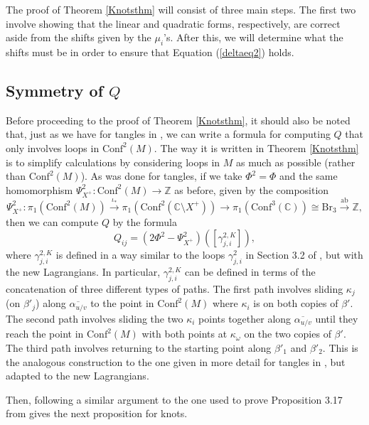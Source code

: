 \documentclass[11pt]{amsart}
\theoremstyle{plain}
\theoremstyle{definition}
\theoremstyle{remark}
\begin{document}
The proof of Theorem \ref{Knotsthm} will consist of three main steps. The first two involve showing that the linear and quadratic forms, respectively, are correct aside from the shifts given by the $\mu_i$'s. After this, we will determine what the shifts must be in order to ensure that Equation (\ref{deltaeq2}) holds.  

\subsection{Symmetry of $Q$}

Before proceeding to the proof of Theorem \ref{Knotsthm}, it should also be noted that, just as we have for tangles in \cite{JHpI26}, we can write a formula for computing $Q$ that only involves loops in $\text{Conf}^2(M)$. The way it is written in Theorem \ref{Knotsthm} is to simplify calculations by considering loops in $M$ as much as possible (rather than $\text{Conf}^2(M)$). As was done for tangles, if we take $\Phi^2=\Phi$ and the same homomorphism $\Psi_{X^+}^2:\text{Conf}^2(M)\to\mathbb{Z}$  as before, given by the composition
\[
\Psi_{X^+}^2:\pi_1(\text{Conf}^2(M))\xrightarrow{\iota_*}\pi_1(\text{Conf}^2(\mathbb{C}\setminus X^+))\to \pi_1(\text{Conf}^3(\mathbb{C}))\cong \text{Br}_3\xrightarrow{\text{ab}}\mathbb{Z},
\]
then we can compute $Q$ by the formula
\begin{equation}
\label{Conf2Qeq}
Q_{ij}=(2\Phi^2-\Psi_{X^+}^2)([\gamma_{j,i}^{2,K}]),
\end{equation}
where $\gamma_{j,i}^{2,K}$ is defined in a way similar to the loops $\gamma_{j,i}^2$ in Section 3.2 of \cite{JHpI26}, but with the new Lagrangians. In particular, $\gamma_{j,i}^{2,K}$ can be defined in terms of the concatenation of three different types of paths. The first path involves sliding $\kappa_j$ (on $\beta'_j$) along $\overline{\alpha_{u/v}}$ to the point in $\text{Conf}^2(M)$ where $\kappa_i$ is on both copies of $\beta'$. The second path involves sliding the two $\kappa_i$ points together along $\overline{\alpha_{u/v}}$ until they reach the point in $\text{Conf}^2(M)$ with both points at $\kappa_\omega$ on the two copies of $\beta'$. The third path involves returning to the starting point along $\beta'_1$ and $\beta'_2$. This is the analogous construction to the one given in more detail for tangles in \cite{JHpI26}, but adapted to the new Lagrangians.

Then, following a similar argument to the one used to prove Proposition 3.17 from \cite{JHpI26} gives the next proposition for knots.
\end{document}
